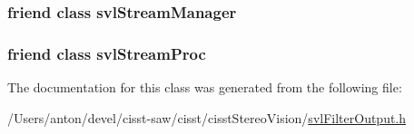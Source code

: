 \subsubsection[{svl\+Stream\+Manager}]{\setlength{\rightskip}{0pt plus 5cm}friend class {\bf svl\+Stream\+Manager}\hspace{0.3cm}{\ttfamily [friend]}}\label{classsvl_filter_output_ab5eee58544f2ce644140e932afbe32db}
\hypertarget{classsvl_filter_output_a6a9ee1dec5ca263793dca09411295245}{}
\subsubsection[{svl\+Stream\+Proc}]{\setlength{\rightskip}{0pt plus 5cm}friend class {\bf svl\+Stream\+Proc}\hspace{0.3cm}{\ttfamily [friend]}}\label{classsvl_filter_output_a6a9ee1dec5ca263793dca09411295245}


The documentation for this class was generated from the following file\+:\begin{DoxyCompactItemize}
\item 
/\+Users/anton/devel/cisst-\/saw/cisst/cisst\+Stereo\+Vision/\hyperlink{svl_filter_output_8h}{svl\+Filter\+Output.\+h}\end{DoxyCompactItemize}
